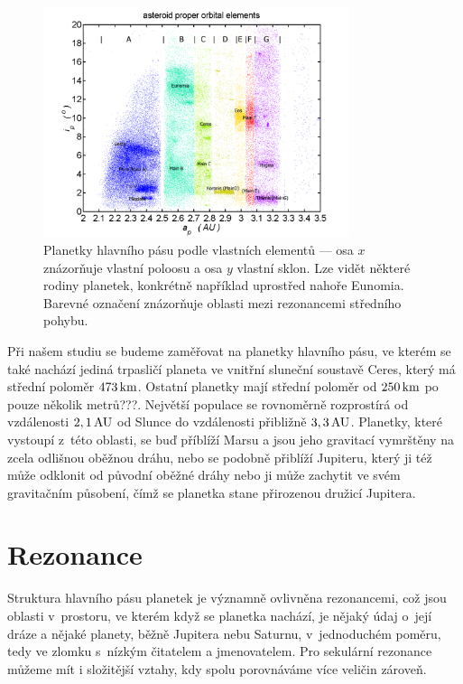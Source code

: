 \documentclass[A4paper, 12pt, oneside]{book}
\begin{document}
\begin{figure}
	\centering
	\includegraphics[width=0.8\textwidth]{obr/mainbelt.png}
	\caption{Planetky hlavního pásu podle vlastních elementů --- osa $x$ znázorňuje vlastní poloosu a osa $y$ vlastní sklon. Lze vidět některé rodiny planetek, konkrétně například uprostřed nahoře Eunomia. Barevné označení znázorňuje oblasti mezi rezonancemi středního pohybu.} \label{fig:belt}
\end{figure}

Při našem studiu se budeme zaměřovat na planetky hlavního pásu, ve kterém se také nachází jediná trpasličí planeta ve vnitřní sluneční soustavě Ceres, který má střední poloměr $473\, {\rm km}$. Ostatní planetky mají střední poloměr od $250\, {\rm km}$ po pouze několik metrů???. Největší populace se rovnoměrně rozprostírá od vzdálenosti $2,1\, {\rm AU}$ od Slunce do vzdálenosti přibližně $3,3\, {\rm AU}$. Planetky, které vystoupí z~této oblasti, se buď příblíží Marsu a jsou jeho gravitací vymrštěny na zcela odlišnou oběžnou dráhu, nebo se podobně přiblíží Jupiteru, který ji též může odklonit od původní oběžné dráhy nebo ji může zachytit ve svém gravitačním působení, čímž se planetka stane přirozenou družicí Jupitera. 

\section{Rezonance}
Struktura hlavního pásu planetek je významně ovlivněna rezonancemi, což jsou oblasti v~prostoru, ve kterém když se planetka nachází, je nějaký údaj o~její dráze a nějaké planety, běžně Jupitera nebu Saturnu, v~jednoduchém poměru, tedy ve zlomku s~nízkým čitatelem a jmenovatelem. Pro sekulární rezonance můžeme mít i složitější vztahy, kdy spolu porovnáváme více veličin zároveň. 
\end{document}
